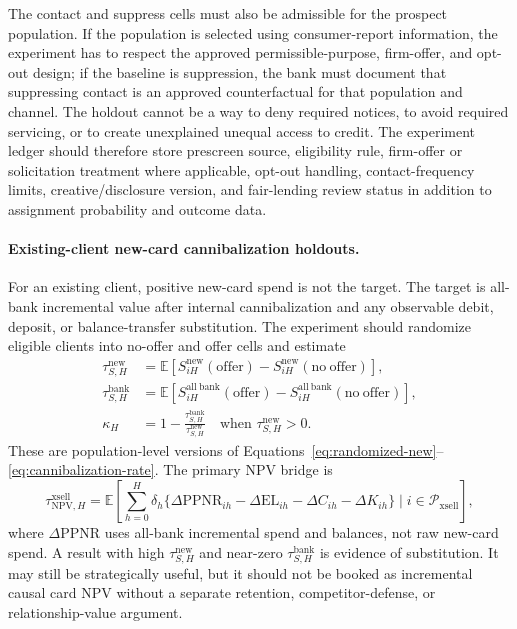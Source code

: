 \documentclass[11pt]{article}
\newcommand{\E}{\mathbb{E}}
\newcommand{\NPV}{\mathrm{NPV}}
\newcommand{\EL}{\mathrm{EL}}
\newcommand{\PPNR}{\mathrm{PPNR}}
\newcommand{\1}{\mathbf{1}}
\begin{document}
The contact and suppress cells must also be admissible for the prospect
population. If the population is selected using consumer-report information,
the experiment has to respect the approved permissible-purpose, firm-offer,
and opt-out design; if the baseline is suppression, the bank must document
that suppressing contact is an approved counterfactual for that population and
channel. The holdout cannot be a way to deny required notices, to avoid
required servicing, or to create unexplained unequal access to credit. The
experiment ledger should therefore store prescreen source, eligibility rule,
firm-offer or solicitation treatment where applicable, opt-out handling,
contact-frequency limits, creative/disclosure version, and fair-lending review
status in addition to assignment probability and outcome data.

\paragraph{Existing-client new-card cannibalization holdouts.}
For an existing client, positive new-card spend is not the target. The target
is all-bank incremental value after internal cannibalization and any
observable debit, deposit, or balance-transfer substitution. The experiment
should randomize eligible clients into no-offer and offer cells and estimate
\begin{align}
  \tau^{\mathrm{new}}_{S,H}
    &=
    \E[S^{\mathrm{new}}_{iH}(\mathrm{offer})
      -S^{\mathrm{new}}_{iH}(\mathrm{no\ offer})], \\
  \tau^{\mathrm{bank}}_{S,H}
    &=
    \E[S^{\mathrm{all\ bank}}_{iH}(\mathrm{offer})
      -S^{\mathrm{all\ bank}}_{iH}(\mathrm{no\ offer})], \\
  \kappa_H
    &=
    1-\frac{\tau^{\mathrm{bank}}_{S,H}}{\tau^{\mathrm{new}}_{S,H}}
    \quad \text{when } \tau^{\mathrm{new}}_{S,H}>0.
    \label{eq:experimental-cannibalization}
\end{align}
These are population-level versions of
Equations~\eqref{eq:randomized-new}--\eqref{eq:cannibalization-rate}. The
primary NPV bridge is
\begin{equation}
  \tau^{\mathrm{xsell}}_{\NPV,H}
  =
  \E\!\left[
    \sum_{h=0}^{H}\delta_h
    \{\Delta \PPNR_{ih}-\Delta \EL_{ih}-\Delta C_{ih}
      -\Delta K_{ih}\}
    \mid i\in\mathcal{P}_{\mathrm{xsell}}
  \right],
  \label{eq:xsell-npv-estimand}
\end{equation}
where $\Delta \PPNR$ uses all-bank incremental spend and balances, not raw
new-card spend. A result with high $\tau^{\mathrm{new}}_{S,H}$ and near-zero
$\tau^{\mathrm{bank}}_{S,H}$ is evidence of substitution. It may still be
strategically useful, but it should not be booked as incremental causal card
NPV without a separate retention, competitor-defense, or relationship-value
argument.
\end{document}
